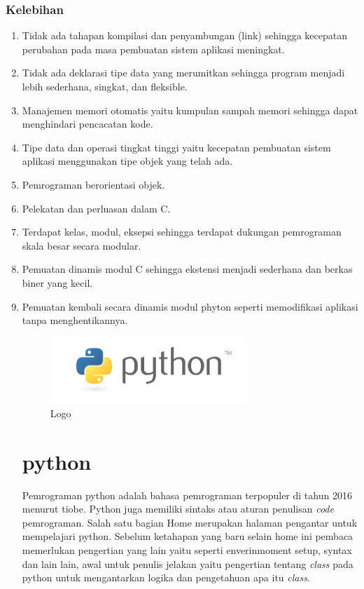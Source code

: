 \subsubsection{Kelebihan}
\begin{enumerate}
\item Tidak ada tahapan kompilasi dan penyambungan (link) sehingga kecepatan perubahan pada masa pembuatan sistem aplikasi meningkat.
\item Tidak ada deklarasi tipe data yang merumitkan sehingga program menjadi lebih sederhana, singkat, dan fleksible.
\item Manajemen memori otomatis yaitu kumpulan sampah memori sehingga dapat menghindari pencacatan kode.
\item Tipe data dan operasi tingkat tinggi yaitu kecepatan pembuatan sistem aplikasi menggunakan tipe objek yang telah ada.
\item Pemrograman berorientasi objek.
\item Pelekatan dan perluasan dalam C.
\item Terdapat kelas, modul, eksepsi sehingga terdapat dukungan pemrograman skala besar secara modular.
\item Pemuatan dinamis modul C sehingga ekstensi menjadi sederhana dan berkas biner yang kecil.
\item Pemuatan kembali secara dinamis modul phyton seperti memodifikasi aplikasi tanpa menghentikannya.



\begin{figure}[ht]
	\centerline{\includegraphics[width=0.70\textwidth]{figures/python}}
	\caption{Logo}
	\label{Logo}
\end{figure}

\section{python}

Pemrograman python adalah bahasa pemrograman terpopuler di tahun 2016 menurut tiobe. Python juga memiliki sintaks atau aturan penulisan \textit{code} pemrograman. Salah satu bagian Home merupakan halaman pengantar untuk mempelajari python. Sebelum ketahapan yang baru selain home ini pembaca memerlukan pengertian yang lain yaitu seperti enverinmoment setup, syntax dan lain lain, awal untuk penulis jelakan yaitu pengertian tentang \textit{class} pada python untuk mengantarkan logika dan pengetahuan apa itu \textit{class}.



\end{enumerate}
